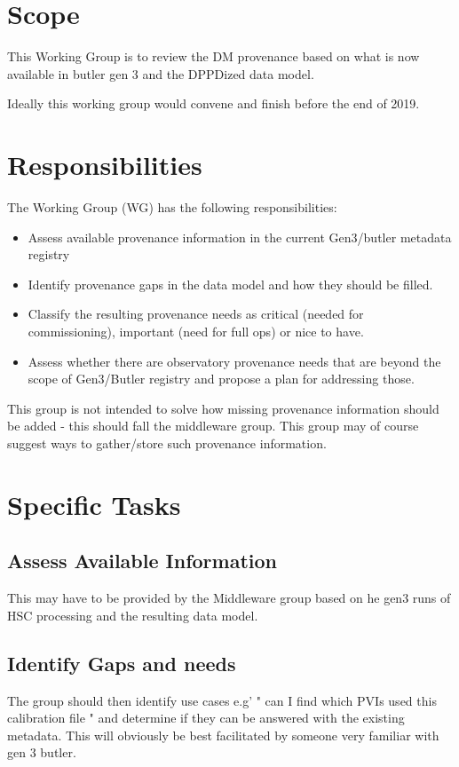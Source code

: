 
\section{Scope}

This Working Group is to review the \gls{DM} \gls{provenance} based on what is now
available in butler gen 3 and the DPPDized data model.

 Ideally this working group would convene and finish before the end of 2019.

\section{Responsibilities}

The Working Group (\gls{WG}) has the following responsibilities:

\begin{itemize}
    \item Assess available \gls{provenance} information in the current Gen3/butler \gls{metadata} registry
    \item Identify \gls{provenance} gaps in the data model and how they should be filled.
    \item Classify the resulting \gls{provenance} needs as critical (needed for commissioning), important (need for full ops) or nice to have.
    \item Assess whether there are observatory provenance needs that are beyond  the scope of Gen3/Butler registry and propose a plan for addressing those.
\end{itemize}

This group is not intended to solve how missing \gls{provenance} information should be added - this should fall the middleware group.
This group may of course suggest ways to gather/store such \gls{provenance} information.

\section{Specific Tasks}

\subsection{ Assess Available Information}

This may have to be provided by the Middleware group based on he gen3 runs of \gls{HSC} processing and the
resulting data model.

\subsection{Identify Gaps and needs}
The group should then identify use cases e.g' " can I find which PVIs used this \gls{calibration} file " and determine if they can be answered with the existing \gls{metadata}. This will obviously be best facilitated by someone very familiar with gen 3 butler.

